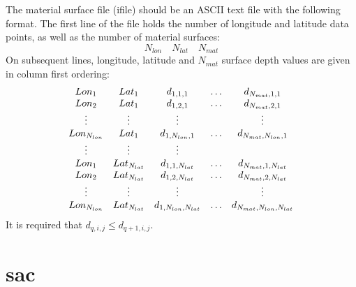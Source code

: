 \documentclass[11pt]{report}
\begin{document}
The material surface file (ifile) should be an ASCII text file with the following format. The first line of the
file holds the number of longitude and latitude data points, as well as the number of material
surfaces:
\[
N_{lon}\quad N_{lat}\quad N_{mat}
\]
On subsequent lines, longitude, latitude and $N_{mat}$ surface depth values are given in column
first ordering:
\[
\begin{array}{c c c c c}
Lon_1 & Lat_1          & d_{1,1,1} & \ldots & d_{N_{mat},1,1}\\
Lon_2& Lat_1           & d_{1,2,1} & \ldots & d_{N_{mat},2,1}\\
\vdots&\vdots&\vdots & & \vdots\\
Lon_{N_{lon}}& Lat_1      & d_{1,N_{lon},1} & \ldots & d_{N_{mat},N_{lon},1}\\
\vdots&\vdots&\vdots\\
Lon_1 & Lat_{N_{lat}}     & d_{1,1,N_{lat}} & \ldots & d_{N_{mat},1,N_{lat}}\\
Lon_2& Lat_{N_{lat}}      & d_{1,2,N_{lat}} & \ldots & d_{N_{mat},2,N_{lat}}\\
\vdots&\vdots&\vdots & & \vdots\\
Lon_{N_{lon}}& Lat_{N_{lat}} & d_{1,N_{lon},N_{lat}} & \ldots & d_{N_{mat},N_{lon},N_{lat}}
\end{array}
\]
It is required that $d_{q,i,j} \leq d_{q+1,i,j}$.

\section{sac}\label{sec:sac-format}
\end{document}
